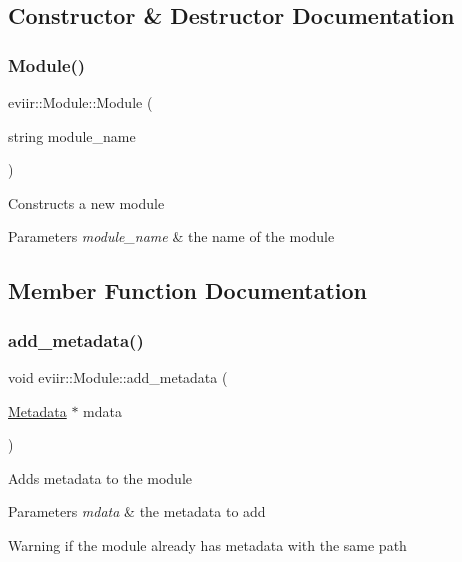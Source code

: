 \subsection{Constructor \& Destructor Documentation}
\mbox{\label{classeviir_1_1Module_ab7ce8b6952df04e8c7f4daf6deb37df6}} 
\subsubsection{\texorpdfstring{Module()}{Module()}}
{\footnotesize\ttfamily eviir\+::\+Module\+::\+Module (\begin{DoxyParamCaption}\item[{string}]{module\+\_\+name }\end{DoxyParamCaption})}

Constructs a new module 
\begin{DoxyParams}{Parameters}
{\em module\+\_\+name} & the name of the module \\
\hline
\end{DoxyParams}


\subsection{Member Function Documentation}
\mbox{\label{classeviir_1_1Module_a9e4bc38ac7d619c039a0bb0559589399}} 
\subsubsection{\texorpdfstring{add\+\_\+metadata()}{add\_metadata()}}
{\footnotesize\ttfamily void eviir\+::\+Module\+::add\+\_\+metadata (\begin{DoxyParamCaption}\item[{\hyperlink{classeviir_1_1Metadata}{Metadata} $\ast$}]{mdata }\end{DoxyParamCaption})}

Adds metadata to the module 
\begin{DoxyParams}{Parameters}
{\em mdata} & the metadata to add \\
\hline
\end{DoxyParams}
\begin{DoxyWarning}{Warning}
if the module already has metadata with the same path 
\end{DoxyWarning}
\mbox{\label{classeviir_1_1Module_af111f61808e14d845bff062f0d782006}} 
